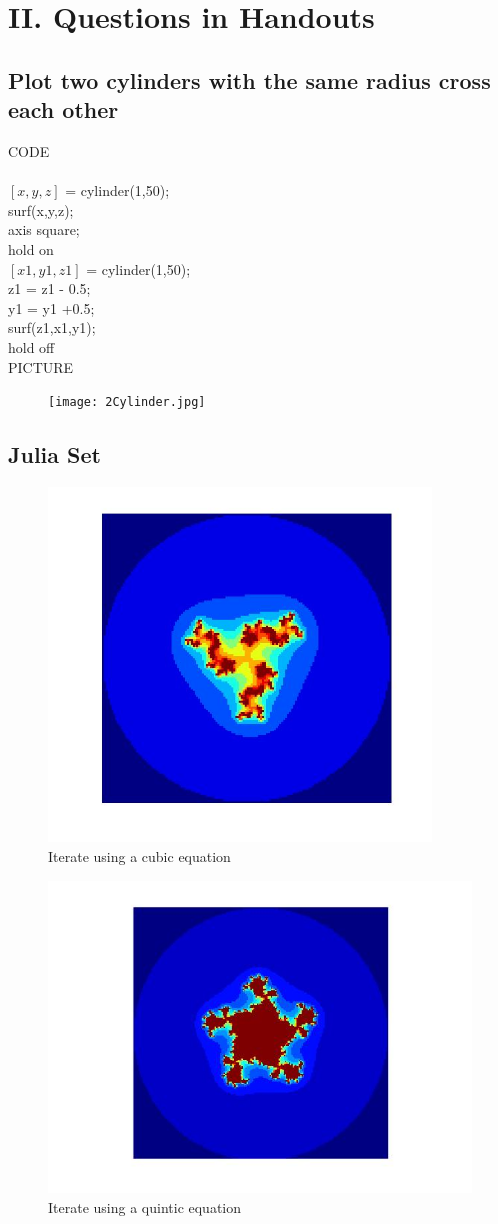 \documentclass[twoside,a4paper]{article}
\begin{document}
\section*{II. Questions in Handouts}
\subsection*{Plot two cylinders with the same radius cross each other}
\Large{CODE}\\
\\
$[x,y,z]$ = cylinder(1,50);\\
surf(x,y,z);\\
axis square;\\
hold on\\
$[x1,y1,z1]$ = cylinder(1,50);\\
z1 = z1 - 0.5;\\
y1 = y1 +0.5;\\
surf(z1,x1,y1);\\
hold off\\
\Large{PICTURE}
\begin{figure}[b]
\centering
\texttt{[image: 2Cylinder.jpg]}
\end{figure}

\subsection*{Julia Set}
\begin{figure}[H]
\centering
\includegraphics[width=4in]{julia3.jpg}
\caption{Iterate using a cubic equation}
\end{figure}
\begin{figure}[H]
\centering
\includegraphics[width=5in]{julia5.jpg}
\caption{Iterate using a quintic equation}
\end{figure}
\end{document}
